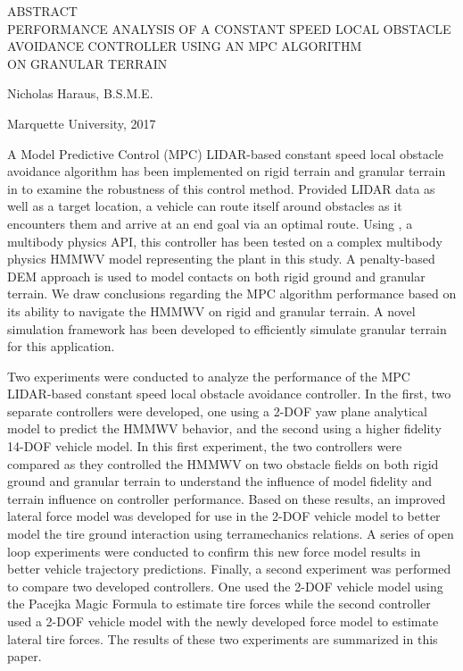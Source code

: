 \documentclass[12pt,onecolumn]{report}
\newcommand{\CHRONO}{{\sffamily{{Chrono}}}}
\begin{document}
\begin{singlespacing}
\begin{center}

ABSTRACT\\
PERFORMANCE ANALYSIS OF A CONSTANT SPEED LOCAL OBSTACLE\\ AVOIDANCE CONTROLLER USING AN MPC ALGORITHM\\ ON GRANULAR TERRAIN\\

\vspace{0.2in}

Nicholas Haraus, B.S.M.E.\\
\vspace{0.1in}

Marquette University, 2017
\end{center}

\vspace{0.2in}

A Model Predictive Control (MPC) LIDAR-based constant speed local obstacle avoidance algorithm has been implemented on rigid terrain and granular terrain in {\CHRONO} to examine the robustness of this control method. Provided LIDAR data as well as a target location, a vehicle can route itself around obstacles as it encounters them and arrive at an end goal via an optimal route. Using {\CHRONO}, a multibody physics API, this controller has been tested on a complex multibody physics HMMWV model representing the plant in this study. A penalty-based DEM approach is used to model contacts on both rigid ground and granular terrain. We draw conclusions regarding the MPC algorithm performance based on its ability to navigate the {\CHRONO} HMMWV on rigid and granular terrain. A novel simulation framework has been developed to efficiently simulate granular terrain for this application.

Two experiments were conducted to analyze the performance of the MPC LIDAR-based constant speed local obstacle avoidance controller. In the first, two separate controllers were developed, one using a 2-DOF yaw plane analytical model to predict the HMMWV behavior, and the second using a higher fidelity 14-DOF vehicle model. In this first experiment, the two controllers were compared as they controlled the HMMWV on two obstacle fields on both rigid ground and granular terrain to understand the influence of model fidelity and terrain influence on controller performance. Based on these results, an improved lateral force model was developed for use in the 2-DOF vehicle model to better model the tire ground interaction using terramechanics relations. A series of open loop experiments were conducted to confirm this new force model results in better vehicle trajectory predictions. Finally, a second experiment was performed to compare two developed controllers. One used the 2-DOF vehicle model using the Pacejka Magic Formula to estimate tire forces while the second controller used a 2-DOF vehicle model with the newly developed force model to estimate lateral tire forces. The results of these two experiments are summarized in this paper.


\vfill
\end{singlespacing}
\newpage
\end{document}
